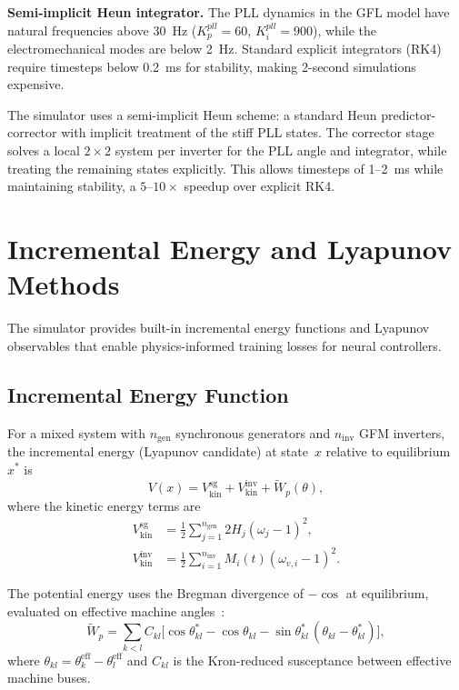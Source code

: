 \documentclass[11pt]{article}
\begin{document}
\textbf{Semi-implicit Heun integrator.}  The PLL dynamics in the GFL
model have natural frequencies above 30~Hz ($K_p^{pll} = 60$,
$K_i^{pll} = 900$), while the electromechanical modes are below 2~Hz.
Standard explicit integrators (RK4) require timesteps below 0.2~ms
for stability, making 2-second simulations expensive.

The simulator uses a semi-implicit Heun scheme: a standard Heun
predictor-corrector with implicit treatment of the stiff PLL states.
The corrector stage solves a local $2 \times 2$ system per inverter
for the PLL angle and integrator, while treating the remaining states
explicitly.  This allows timesteps of 1--2~ms while maintaining
stability, a $5$--$10\times$ speedup over explicit RK4.

\section{Incremental Energy and Lyapunov Methods}
\label{sec:lyapunov}

The simulator provides built-in incremental energy functions and
Lyapunov observables that enable physics-informed training losses for
neural controllers.

\subsection{Incremental Energy Function}

For a mixed system with $n_{\mathrm{gen}}$ synchronous generators and
$n_{\mathrm{inv}}$ GFM inverters, the incremental energy (Lyapunov
candidate) at state~$x$ relative to equilibrium~$x^*$ is
\begin{equation}
  V(x) = V_{\mathrm{kin}}^{\mathrm{sg}}
    + V_{\mathrm{kin}}^{\mathrm{inv}}
    + \tilde{W}_p(\theta),
  \label{eq:lyap}
\end{equation}
where the kinetic energy terms are
\begin{align}
  V_{\mathrm{kin}}^{\mathrm{sg}}
    &= \frac{1}{2}\sum_{j=1}^{n_{\mathrm{gen}}}
    2H_j (\omega_j - 1)^2, \label{eq:vkin_sg} \\
  V_{\mathrm{kin}}^{\mathrm{inv}}
    &= \frac{1}{2}\sum_{i=1}^{n_{\mathrm{inv}}}
    M_i(t) (\omega_{v,i} - 1)^2. \label{eq:vkin_inv}
\end{align}

The potential energy uses the Bregman divergence of $-\cos$ at
equilibrium, evaluated on effective machine
angles~\cite{Pai89}:
\begin{equation}
  \tilde{W}_p = \sum_{k < l} C_{kl}\bigl[
    \cos\theta_{kl}^* - \cos\theta_{kl}
    - \sin\theta_{kl}^*\,(\theta_{kl} - \theta_{kl}^*)\bigr],
  \label{eq:wpot}
\end{equation}
where $\theta_{kl} = \theta_k^{\mathrm{eff}} - \theta_l^{\mathrm{eff}}$
and $C_{kl}$ is the Kron-reduced susceptance between effective machine
buses.
\end{document}
